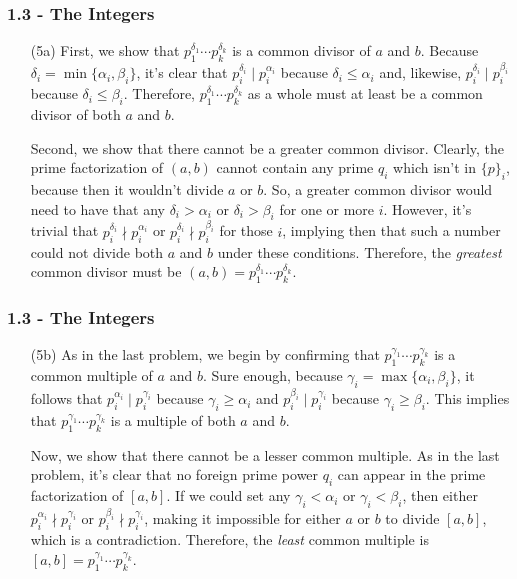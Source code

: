 \documentclass{beamer}
\begin{document}
\begin{frame}
\frametitle{1.3 - The Integers}
\small
\begin{enumerate}
	\item[(5a)] \quad First, we show that $p_1^{\delta_1}\cdots p_k^{\delta_k}$ is a common divisor of $a$ and $b$. Because $\delta_i = \min\{\alpha_i, \beta_i\}$, it's clear that $p_i^{\delta_i} \mid p_i^{\alpha_i}$ because $\delta_i \leq\alpha_i$ and, likewise, $p_i^{\delta_i}\mid p_i^{\beta_i}$ because $\delta_i\leq\beta_i$. Therefore, $p_1^{\delta_1}\cdots p_k^{\delta_k}$ as a whole must at least be a common divisor of both $a$ and $b$.
	
	\quad Second, we show that there cannot be a greater common divisor. Clearly, the prime factorization of $(a,b)$ cannot contain any prime $q_i$ which isn't in $\{p\}_i$, because then it wouldn't divide $a$ or $b$. So, a greater common divisor would need to have that any $\delta_i > \alpha_i$ or $\delta_i > \beta_i$ for one or more $i$. However, it's trivial that $p_i^{\delta_i} \nmid p_i^{\alpha_i}$ or $p_i^{\delta_i}\nmid p_i^{\beta_i}$ for those $i$, implying then that such a number could not divide both $a$ and $b$ under these conditions. Therefore, the \textit{greatest} common divisor must be $(a,b) = p_1^{\delta_1}\cdots p_k^{\delta_k}$.
\end{enumerate}
\end{frame}
\begin{frame}
\frametitle{1.3 - The Integers}
\small
\begin{enumerate}
	\item[(5b)] \quad As in the last problem, we begin by confirming that $p_1^{\gamma_1}\cdots p_k^{\gamma_k}$ is a common multiple of $a$ and $b$. Sure enough, because $\gamma_i = \max\{\alpha_i, \beta_i\}$, it follows that $p_i^{\alpha_i}\mid p_i^{\gamma_i}$ because $\gamma_i\geq \alpha_i$ and $p_i^{\beta_i}\mid p_i^{\gamma_i}$ because $\gamma_i\geq\beta_i$. This implies that $p_1^{\gamma_1}\cdots p_k^{\gamma_k}$ is a multiple of both $a$ and $b$. 
	
	\quad Now, we show that there cannot be a lesser common multiple. As in the last problem, it's clear that no foreign prime power $q_i$ can appear in the prime factorization of $\left[a,b\right]$. If we could set any $\gamma_i < \alpha_i$ or $\gamma_i < \beta_i$, then either $p_i^{\alpha_i}\nmid p_i^{\gamma_i}$ or $p_i^{\beta_i}\nmid p_i^{\gamma_i}$, making it impossible for either $a$ or $b$ to divide $\left[a,b\right]$, which is a contradiction. Therefore, the \textit{least} common multiple is $\left[a,b\right] = p_1^{\gamma_1}\cdots p_k^{\gamma_k}$.
\end{enumerate}
\end{frame}
\end{document}
